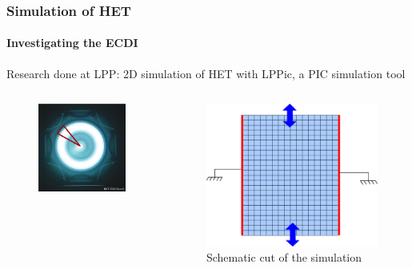 \documentclass[sans, aspectratio=169]{beamer}
\begin{document}
\begin{frame} 
	\frametitle{Simulation of HET} 
	\framesubtitle{ Investigating the ECDI } 
	Research done at LPP: 
	2D simulation of HET with LPPic, a PIC simulation tool
	\begin{columns}

	\begin{column}{0.45\linewidth}
		\begin{figure}[hbtp]
		\centering
		\includegraphics[scale=0.25]{images/Simulationcut.png}
	\end{figure}
	
	\end{column}

	\begin{column}{0.45\linewidth}
		\begin{figure}[hbtp]
		\centering
		\includegraphics[scale=0.5]{images/2D_Rtheta.png}
		\caption{Schematic cut of the simulation}
		\end{figure}
	

\end{column}
\end{columns}
\end{frame}
\end{document}
